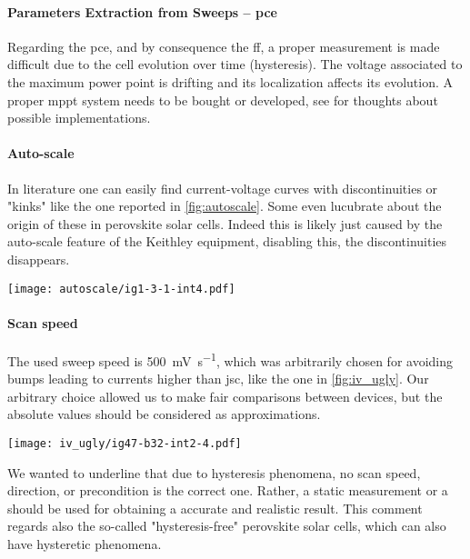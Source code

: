	\paragraph{Parameters Extraction from Sweeps -- \gls{pce}} Regarding the \gls{pce}, and by consequence the \gls{ff}, a proper measurement is made difficult due to the cell evolution over time (hysteresis). The voltage associated to the maximum power point is drifting and its localization affects its evolution. A proper \gls{mppt} system needs to be bought or developed, see  for thoughts about possible implementations.

	\paragraph{Auto-scale}\label{autoscale} In literature one can easily find current-voltage curves with discontinuities or "kinks" \cite{Li2016,Snaith2014,Zhang2015} like the one reported in \cref{fig:autoscale}. Some even lucubrate about the origin of these in perovskite solar cells. Indeed this is likely just caused by the auto-scale feature of the Keithley equipment, disabling this, the discontinuities disappears.

	\begin{SCfigure}%
		\centering
		\texttt{[image: autoscale/ig1-3-1-int4.pdf]}
		\label{fig:autoscale}
	\end{SCfigure}

	\paragraph{Scan speed} The used sweep speed is \SI{500}{\mV\per\s}, which was arbitrarily chosen for avoiding bumps leading to currents higher than \gls{jsc}, like the one in \cref{fig:iv_ugly}. %
	Our arbitrary choice allowed us to make fair comparisons between devices, but the absolute values should be considered as approximations.
	\begin{SCfigure}%
		\centering
		\texttt{[image: iv\_ugly/ig47-b32-int2-4.pdf]}
		\label{fig:iv_ugly}
	\end{SCfigure}
	We wanted to underline that due to hysteresis phenomena, no scan speed, direction, or precondition is the correct one.  %
	Rather, a static measurement or a  should be used for obtaining a accurate and realistic result.
	This comment regards also the so-called "hysteresis-free" perovskite solar cells, which can also have hysteretic phenomena\cite{Jacobs2018}.

